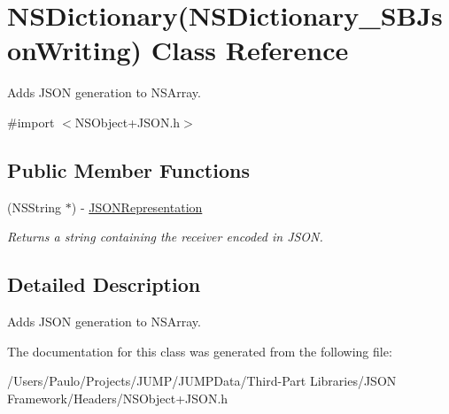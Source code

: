 \hypertarget{interface_n_s_dictionary_07_n_s_dictionary___s_b_json_writing_08}{
\section{NSDictionary(NSDictionary\_\-SBJsonWriting) Class Reference}
\label{interface_n_s_dictionary_07_n_s_dictionary___s_b_json_writing_08}
}


Adds JSON generation to NSArray.  




{\ttfamily \#import $<$NSObject+JSON.h$>$}

\subsection*{Public Member Functions}
\begin{DoxyCompactItemize}
\item 
\hypertarget{interface_n_s_dictionary_07_n_s_dictionary___s_b_json_writing_08_adf5473dc83d31a1d48009d973c5778c4}{
(NSString $\ast$) -\/ \hyperlink{interface_n_s_dictionary_07_n_s_dictionary___s_b_json_writing_08_adf5473dc83d31a1d48009d973c5778c4}{JSONRepresentation}}
\label{interface_n_s_dictionary_07_n_s_dictionary___s_b_json_writing_08_adf5473dc83d31a1d48009d973c5778c4}

\begin{DoxyCompactList}\small\item\em Returns a string containing the receiver encoded in JSON. \item\end{DoxyCompactList}\end{DoxyCompactItemize}


\subsection{Detailed Description}
Adds JSON generation to NSArray. 

The documentation for this class was generated from the following file:\begin{DoxyCompactItemize}
\item 
/Users/Paulo/Projects/JUMP/JUMPData/Third-\/Part Libraries/JSON Framework/Headers/NSObject+JSON.h\end{DoxyCompactItemize}
